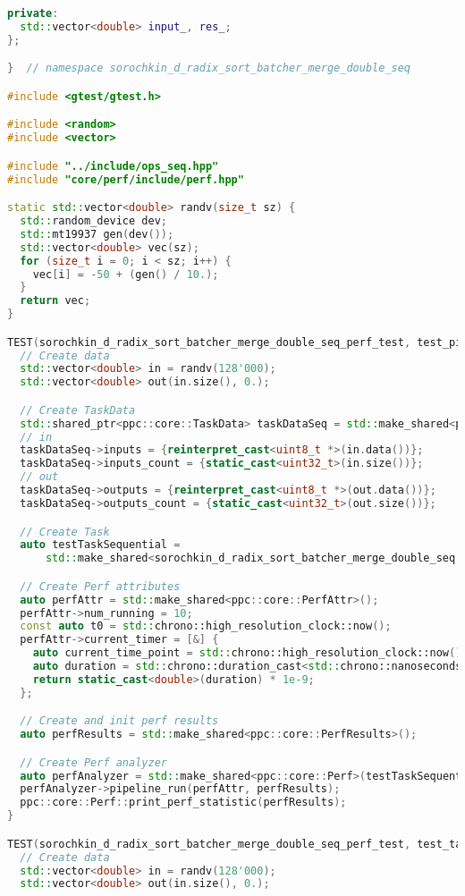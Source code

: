 \documentclass[12pt]{article}
\begin{document}
\begin{lstlisting}[language=C++, caption={Код алгоритма}]
 private:
  std::vector<double> input_, res_;
};

}  // namespace sorochkin_d_radix_sort_batcher_merge_double_seq

#include <gtest/gtest.h>

#include <random>
#include <vector>

#include "../include/ops_seq.hpp"
#include "core/perf/include/perf.hpp"

static std::vector<double> randv(size_t sz) {
  std::random_device dev;
  std::mt19937 gen(dev());
  std::vector<double> vec(sz);
  for (size_t i = 0; i < sz; i++) {
    vec[i] = -50 + (gen() / 10.);
  }
  return vec;
}

TEST(sorochkin_d_radix_sort_batcher_merge_double_seq_perf_test, test_pipeline_run) {
  // Create data
  std::vector<double> in = randv(128'000);
  std::vector<double> out(in.size(), 0.);

  // Create TaskData
  std::shared_ptr<ppc::core::TaskData> taskDataSeq = std::make_shared<ppc::core::TaskData>();
  // in
  taskDataSeq->inputs = {reinterpret_cast<uint8_t *>(in.data())};
  taskDataSeq->inputs_count = {static_cast<uint32_t>(in.size())};
  // out
  taskDataSeq->outputs = {reinterpret_cast<uint8_t *>(out.data())};
  taskDataSeq->outputs_count = {static_cast<uint32_t>(out.size())};

  // Create Task
  auto testTaskSequential =
      std::make_shared<sorochkin_d_radix_sort_batcher_merge_double_seq::TestTaskSequential>(taskDataSeq);

  // Create Perf attributes
  auto perfAttr = std::make_shared<ppc::core::PerfAttr>();
  perfAttr->num_running = 10;
  const auto t0 = std::chrono::high_resolution_clock::now();
  perfAttr->current_timer = [&] {
    auto current_time_point = std::chrono::high_resolution_clock::now();
    auto duration = std::chrono::duration_cast<std::chrono::nanoseconds>(current_time_point - t0).count();
    return static_cast<double>(duration) * 1e-9;
  };

  // Create and init perf results
  auto perfResults = std::make_shared<ppc::core::PerfResults>();

  // Create Perf analyzer
  auto perfAnalyzer = std::make_shared<ppc::core::Perf>(testTaskSequential);
  perfAnalyzer->pipeline_run(perfAttr, perfResults);
  ppc::core::Perf::print_perf_statistic(perfResults);
}

TEST(sorochkin_d_radix_sort_batcher_merge_double_seq_perf_test, test_task_run) {
  // Create data
  std::vector<double> in = randv(128'000);
  std::vector<double> out(in.size(), 0.);


\end{lstlisting}
\end{document}
